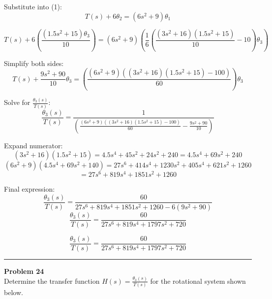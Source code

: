 Substitute into (1):
\[
T(s) + 6\theta_2 = (6s^2 + 9)\theta_1
\]

\[
T(s) + 6\left( \frac{(1.5s^2 + 15)\theta_3}{10} \right) = (6s^2 + 9)\left( \frac{1}{6} \left( \frac{(3s^2 + 16)(1.5s^2 + 15)}{10} - 10 \right) \theta_3 \right)
\]

Simplify both sides:
\[
T(s) + \frac{9s^2 + 90}{10} \theta_3 = \left( \frac{(6s^2 + 9)((3s^2 + 16)(1.5s^2 + 15) - 100)}{60} \right) \theta_3
\]

Solve for \( \frac{\theta_3(s)}{T(s)} \):
\[
\frac{\theta_3(s)}{T(s)} = \frac{1}{\left( \frac{(6s^2 + 9)((3s^2 + 16)(1.5s^2 + 15) - 100)}{60} - \frac{9s^2 + 90}{10} \right)}
\]

Expand numerator:
\[
(3s^2 + 16)(1.5s^2 + 15) = 4.5s^4 + 45s^2 + 24s^2 + 240 = 4.5s^4 + 69s^2 + 240
\]
\[
(6s^2 + 9)(4.5s^4 + 69s^2 + 140) = 27s^6 + 414s^4 + 1230s^2 + 405s^4 + 621s^2 + 1260
\]
\[
= 27s^6 + 819s^4 + 1851s^2 + 1260
\]

Final expression:
\[
\frac{\theta_3(s)}{T(s)} = \frac{60}{27s^6 + 819s^4 + 1851s^2 + 1260 - 6(9s^2 + 90)}
\]
\[
\frac{\theta_3(s)}{T(s)}  = \frac{60}{27s^6 + 819s^4 + 1797s^2 + 720}
\]

\[
\boxed{\frac{\theta_3(s)}{T(s)} = \frac{60}{27s^6 + 819s^4 + 1797s^2 + 720}}
\]

\newpage

\noindent\rule{\textwidth}{1pt}
\noindent\textbf{Problem 24} \hfill
\\ Determine the transfer function \(H(s) = \frac{\theta_3(s)}{T(s)}\) for the rotational system shown below.

